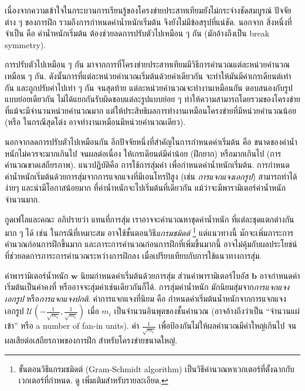 เนื่องจากความเข้าใจในกระบวนการเรียนรู้ของโครงข่ายประสาทเทียมยังไม่กระจ่างชัดสมบูรณ์
ปัจจัยต่าง ๆ ของการฝึก รวมถึงการกำหนดค่าน้ำหนักเริ่มต้น
จึงยังไม่มีข้อสรุปที่แน่ชัด.
นอกจาก
สิ่งหนึ่งที่จำเป็น
คือ ค่าน้ำหนักเริ่มต้น ต้องช่วยลดการปรับตัวไปเหมือน ๆ กัน (มักอ้างถึงเป็น break symmetry).

การปรับตัวไปเหมือน ๆ กัน มาจากการที่โครงข่ายประสาทเทียมมีวิธีการคำนวณแต่ละหน่วยคำนวณเหมือน ๆ กัน.
ดังนั้นการที่แต่ละหน่วยคำนวณเริ่มต้นด้วยค่าเดียวกัน จะทำให้มันมีค่าเกรเดียนต์เท่ากัน และถูกปรับค่าไปเท่า ๆ กัน จนสุดท้าย แต่ละหน่วยคำนวณจะทำงานเหมือนกัน ตอบสนองกับรูปแบบย่อยเดียวกัน 
ไม่ได้แยกกันรับผิดชอบแต่ละรูปแบบย่อย ๆ
ทำให้ความสามารถโดยรวมของโครงข่าย ที่แม้จะมีจำนวนหน่วยคำนวณมาก แต่ให้ประสิทธิผลการทำงานเหมือนโครงข่ายที่มีหน่วยคำนวณน้อย (หรือ ในกรณีสุดโต่ง อาจทำงานเหมือนมีหน่วยคำนวณเดียว).

นอกจากลดการปรับตัวไปเหมือนกัน
อีกปัจจัยหนึ่งที่สำคัญในการกำหนดค่าเริ่มต้น
คือ
ขนาดของค่าน้ำหนักไม่ควรจะมากเกินไป
จนผลต่อเนื่อง
ให้เกรเดียนต์มีค่าน้อย (ฝึกยาก) หรือมากเกินไป (การคำนวณขาดเสถียรภาพ).
แนวปฏิบัติคือ
การใช้การสุ่มค่า เพื่อกำหนดค่าน้ำหนักเริ่มต้น.
การกำหนดค่าน้ำหนักเริ่มต้นด้วยการสุ่มจากการแจกแจงที่มีเอนโทรปีสูง (เช่น \textit{การแจกแจงเอกรูป})
สามารถทำได้ง่ายๆ และน่ามีโอกาสน้อยมาก
ที่ค่าน้ำหนักจะไปเริ่มต้นที่เดียวกัน แม้ว่าจะมีพารามิเตอร์ค่าน้ำหนักจำนวนมาก.

กูดเฟโลและคณะ\cite{GoodfellowEtAl2016}
อภิปรายว่า
แทนที่การสุ่ม
เราอาจจะคำนวณหาชุดค่าน้ำหนัก
ที่แต่ละชุดแตกต่างกันมาก ๆ ได้ 
เช่น ในกรณีที่เหมาะสม อาจใช้ขั้นตอนวิธี\textit{แกรมชมิดต์}%
\footnote{%
ขั้นตอนวิธีแกรมชมิดต์ (Gram-Schmidt algorithm)
เป็นวิธีคำนวณหาเวกเตอร์ที่ตั้งฉากกับเวกเตอร์ที่กำหนด.
ดู \cite{ChongZak2ndEd} เพิ่มเติมสำหรับรายละเอียด.
}
แต่แนวทางนี้ มักจะเพิ่มภาระการคำนวณก่อนการฝึกขึ้นมาก
และภาระการคำนวณก่อนการฝึกที่เพิ่มขึ้นมากนี้ 
อาจไม่คุ้มกับผลประโยชน์ที่ช่วยลดการภาระการคำนวณระหว่างการฝึกลง 
เมื่อเปรียบเทียบกับการใช้แนวทางการสุ่ม.

ค่าพารามิเตอร์น้ำหนัก $\bm{w}$
นิยมกำหนดค่าเริ่มต้นด้วยการสุ่ม
ส่วนค่าพารามิเตอร์ไบอัส $\bm{b}$
อาจกำหนดค่าเริ่มต้นเป็นค่าคงที่
หรืออาจจะสุ่มค่าเช่นเดียวกันก็ได้\cite{GoodfellowEtAl2016}.
การสุ่มค่าน้ำหนัก มักนิยมสุ่มจาก\textit{การแจกแจงเอกรูป}
หรือ\textit{การแจกแจงปกติ}.
ค่าการแจกแจงที่นิยม\cite{GlorotAISTATS2010}
%
คือ กำหนดค่าเริ่มต้นน้ำหนักจากการแจกแจงเอกรูป $\mathcal{U}\left(-\frac{1}{\sqrt{m_i}},\frac{1}{\sqrt{m_i}} \right)$
เมื่อ $m_i$ เป็นจำนวนอินพุตของชั้นคำนวณ 
(อาจอ้างถึงว่าเป็น ``จำนวนแผ่เข้า'' หรือ a number of fan-in units).
ค่า $\frac{1}{\sqrt{m_i}}$
เพื่อป้องกันไม่ให้ผลคำนวณมีค่าใหญ่เกินไป
จนผลเสียต่อเสถียรภาพของการฝึก
สำหรับโครงข่ายขนาดใหญ่.


